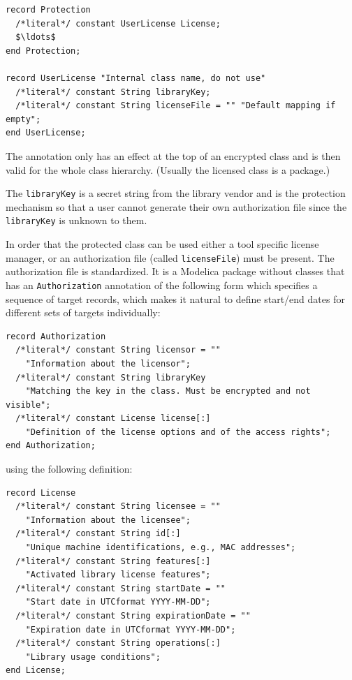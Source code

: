 \begin{annotationdefinition*}[License]\label{modelica:Protection.License}
\begin{synopsis}\begin{lstlisting}
record Protection
  /*literal*/ constant UserLicense License;
  $\ldots$
end Protection;

record UserLicense "Internal class name, do not use"
  /*literal*/ constant String libraryKey;
  /*literal*/ constant String licenseFile = "" "Default mapping if empty";
end UserLicense;
\end{lstlisting}\end{synopsis}
\begin{semantics}
The  annotation only has an effect at the top of an encrypted class and is then valid for the whole class hierarchy.
(Usually the licensed class is a package.)

The \lstinline!libraryKey! is a secret string from the library vendor and is the protection mechanism so that a user cannot generate their own authorization file since the \lstinline!libraryKey! is unknown to them.

In order that the protected class can be used either a tool specific license manager, or an authorization file (called \lstinline!licenseFile!) must be present.
The authorization file is standardized.
It is a Modelica package without classes that has an \lstinline!Authorization! annotation of the following form which specifies a sequence of target records, which makes it natural to define start/end dates for different sets of targets individually:
\begin{lstlisting}[language=modelica]
record Authorization
  /*literal*/ constant String licensor = ""
    "Information about the licensor";
  /*literal*/ constant String libraryKey
    "Matching the key in the class. Must be encrypted and not visible";
  /*literal*/ constant License license[:]
    "Definition of the license options and of the access rights";
end Authorization;
\end{lstlisting}%
using the following definition:
\begin{lstlisting}[language=modelica]
record License
  /*literal*/ constant String licensee = ""
    "Information about the licensee";
  /*literal*/ constant String id[:]
    "Unique machine identifications, e.g., MAC addresses";
  /*literal*/ constant String features[:]
    "Activated library license features";
  /*literal*/ constant String startDate = ""
    "Start date in UTCformat YYYY-MM-DD";
  /*literal*/ constant String expirationDate = ""
    "Expiration date in UTCformat YYYY-MM-DD";
  /*literal*/ constant String operations[:]
    "Library usage conditions";
end License;
\end{lstlisting}


\end{semantics}
\end{annotationdefinition*}
